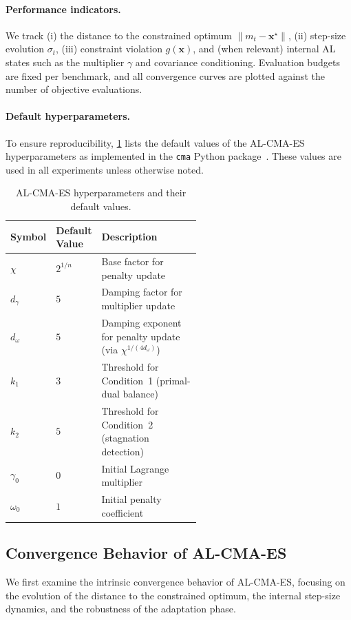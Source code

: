 \documentclass[11pt,a4paper]{article}
\numberwithin{equation}{section}
\numberwithin{figure}{section}
\numberwithin{table}{section}
\theoremstyle{definition}
\begin{document}
\paragraph{Performance indicators.}
We track (i) the distance to the constrained optimum $\|m_t-\bm{x}^\star\|$,
(ii) step-size evolution $\sigma_t$, (iii) constraint violation $g(\bm{x})$,
and (when relevant) internal AL states such as the multiplier $\gamma$ and covariance
conditioning. Evaluation budgets are fixed per benchmark, and all convergence curves are
plotted against the number of objective evaluations.

\paragraph{Default hyperparameters.}
To ensure reproducibility, \cref{tab:al-hyperparams} lists the default values of the AL-CMA-ES hyperparameters as implemented in the \texttt{cma} Python package~\cite{Atamna2017,ArnoldPorter2015}. These values are used in all experiments unless otherwise noted.

\begin{table}[H]
  \centering
  \caption{AL-CMA-ES hyperparameters and their default values.}
  \label{tab:al-hyperparams}
  \begin{tabular}{@{}l l p{0.55\linewidth}@{}}
    \toprule
    {Symbol} & {Default Value} & {Description} \\
    \midrule
    $\chi$ & $2^{1/n}$ & Base factor for penalty update \\
    $d_\gamma$ & $5$ & Damping factor for multiplier update \\
    $d_\omega$ & $5$ & Damping exponent for penalty update (via $\chi^{1/(4d_\omega)}$) \\
    $k_1$ & $3$ & Threshold for Condition~1 (primal-dual balance) \\
    $k_2$ & $5$ & Threshold for Condition~2 (stagnation detection) \\
    $\gamma_0$ & $0$ & Initial Lagrange multiplier \\
    $\omega_0$ & $1$ & Initial penalty coefficient \\
    \bottomrule
  \end{tabular}
\end{table}
\subsection{Convergence Behavior of AL-CMA-ES}

We first examine the intrinsic convergence behavior of AL-CMA-ES,
focusing on the evolution of the distance to the constrained optimum,
the internal step-size dynamics, and the robustness of the adaptation phase.
\end{document}

